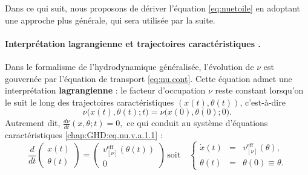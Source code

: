 \medskip


Dans ce qui suit, nous proposons de dériver l'équation \eqref{eq:nuetoile} en adoptant une approche plus générale, qui sera utilisée par la suite.

\paragraph{Interprétation lagrangienne et trajectoires caractéristiques .}
Dans le formalisme de l’hydrodynamique généralisée, l’évolution de $\nu$ est gouvernée par l'équation de transport  \eqref{eq:nu.cont}.  
Cette équation admet une interprétation \textbf{lagrangienne} : le facteur d’occupation $\nu$ reste constant lorsqu’on le suit le long des trajectoires caractéristiques $(x(t),\theta(t))$, c’est-à-dire
\begin{equation}\label{chap6:eq:traj_lagr_0}
\nu\big(x(t),\theta(t);t\big) = \nu\big(x(0),\theta(0);0\big).
\end{equation}
Autrement dit,
\(
\frac{d\nu}{dt}(x,\theta;t) = 0,
\)
ce qui conduit au système d’équations caractéristiques \eqref{chap:GHD:eq.nu.v.a.1.1} :
\begin{equation}
\label{chap6:eq:traj_lagr_1}
\frac{d}{dt} \left( \begin{array}{c} x(t) \\ \theta(t) \end{array} \right)  =  \left( \begin{array}{c} v^{\mathrm{eff}}_{[\nu]}(\theta(t)) \\ 0 \end{array} \right)\, \mbox{soit} \quad \left\{ \begin{array}{rcl}
\displaystyle \dot x (t) & = & v^{\mathrm{eff}}_{[\nu]}(\theta), \\
\theta(t) & = & \theta(0) \equiv \theta.
\end{array} \right. 
\end{equation}

